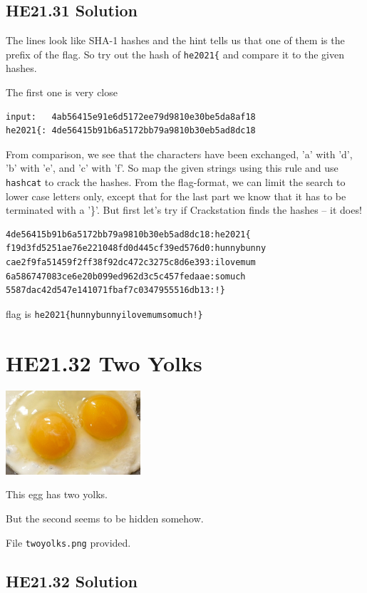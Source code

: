 \documentclass[english,a4paper,nols,noindent]{tufte-handout}
\begin{document}
\hypertarget{he21.31-solution}{%
\subsection{HE21.31 Solution}\label{he21.31-solution}}

\noindent The lines look like SHA-1 hashes and the hint tells us that one of
them is the prefix of the flag.  So try out the hash of \verb+he2021{+ and
compare it to the given hashes.

The first one is very close

\begin{verbatim} 
input:   4ab56415e91e6d5172ee79d9810e30be5da8af18
he2021{: 4de56415b91b6a5172bb79a9810b30eb5ad8dc18
\end{verbatim} 

From comparison, we see that the characters have been exchanged, 'a' with 'd',
'b' with 'e', and 'c' with 'f'.  So map the given strings using this rule and
use \verb+hashcat+ to crack the hashes.  From the flag-format, we can limit the
search to lower case letters only, except that for the last part we know that
it has to be terminated with a '\}'.  But first let's try if Crackstation finds
the hashes -- it does!

\begin{verbatim} 
4de56415b91b6a5172bb79a9810b30eb5ad8dc18:he2021{
f19d3fd5251ae76e221048fd0d445cf39ed576d0:hunnybunny
cae2f9fa51459f2ff38f92dc472c3275c8d6e393:ilovemum
6a586747083ce6e20b099ed962d3c5c457fedaae:somuch
5587dac42d547e141071fbaf7c0347955516db13:!}
\end{verbatim} 

\The flag is \verb+he2021{hunnybunnyilovemumsomuch!}+

\hypertarget{he21.32}{%
\section{HE21.32 Two Yolks}
  \label{he21.32}}
\begin{marginfigure}
    \includegraphics[width=50mm]{images/challenge32.jpg}
\end{marginfigure}

\noindent This egg has two yolks.

But the second seems to be hidden somehow.

File \verb+twoyolks.png+ provided.

\hypertarget{he21.32-solution}{%
\subsection{HE21.32 Solution}\label{he21.32-solution}}

\noindent 
\end{document}
